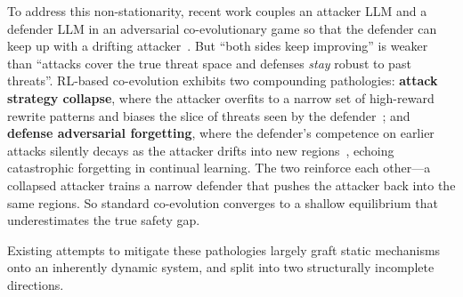\documentclass{article}
\begin{document}
To address this non-stationarity, recent work couples an attacker LLM and a defender LLM in an adversarial co-evolutionary game so that the defender can keep up with a drifting attacker~\citep{liu2025chasing, magic2025, pan2025advevo, ssp2026, triplayrl2026}. But ``both sides keep improving'' is weaker than ``attacks cover the true threat space and defenses \emph{stay} robust to past threats''. RL-based co-evolution exhibits two compounding pathologies: \textbf{attack strategy collapse}, where the attacker overfits to a narrow set of high-reward rewrite patterns and biases the slice of threats seen by the defender~\citep{samvelyan2024rainbow, hong2024curiosity}; and \textbf{defense adversarial forgetting}, where the defender's competence on earlier attacks silently decays as the attacker drifts into new regions~\citep{ssp2026}, echoing catastrophic forgetting in continual learning. The two reinforce each other---a collapsed attacker trains a narrow defender that pushes the attacker back into the same regions. So standard co-evolution converges to a shallow equilibrium that underestimates the true safety gap.

Existing attempts to mitigate these pathologies largely graft static mechanisms onto an inherently dynamic system, and split into two structurally incomplete directions.
\end{document}
